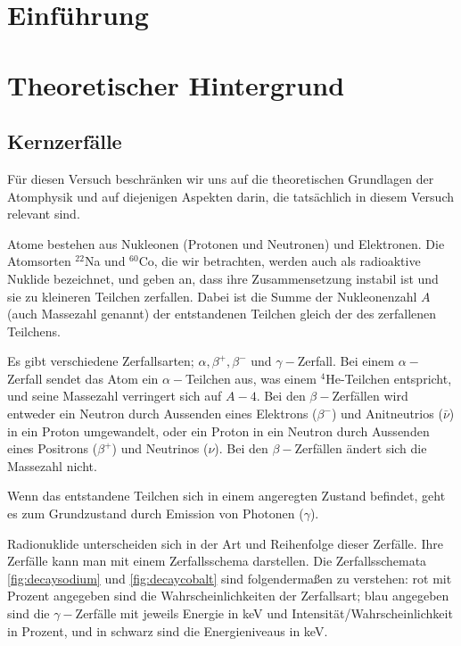 \documentclass[%
aps,
onecolumn,
11pt,
tightenlines,
nofootinbib,
superscriptaddress,
floatfix,
prd,
]{revtex4-2}
\begin{document}

\section{Einführung}
\label{sec:Einführung}






\section{Theoretischer Hintergrund}
\label{sec:Theorie}

\subsection{Kernzerfälle}
\label{sec:Kernzerfälle}
Für diesen Versuch beschränken wir uns auf die theoretischen Grundlagen der Atomphysik und auf diejenigen Aspekten darin, die tatsächlich in diesem Versuch relevant sind. \par
Atome bestehen aus Nukleonen (Protonen und Neutronen) und Elektronen. Die Atomsorten $^{22}$Na und $^{60}$Co, die wir betrachten, werden auch als radioaktive Nuklide bezeichnet, und geben an, dass ihre Zusammensetzung instabil ist und sie zu kleineren Teilchen zerfallen. Dabei ist die Summe der Nukleonenzahl $A$ (auch Massezahl genannt) der entstandenen Teilchen gleich der des zerfallenen Teilchens. \par
Es gibt verschiedene Zerfallsarten; $\alpha, \beta^+, \beta^-$ und $\gamma-$Zerfall. Bei einem $\alpha-$Zerfall sendet das Atom ein $\alpha-$Teilchen aus, was einem $^4$He-Teilchen entspricht, und seine Massezahl verringert sich auf $A - 4$. Bei den $\beta-$Zerfällen wird entweder ein Neutron durch Aussenden eines Elektrons ($\beta^-$) und Anitneutrios ($\bar \nu$) in ein Proton umgewandelt, oder ein Proton in ein Neutron durch Aussenden eines Positrons ($\beta^+$) und Neutrinos ($\nu$). Bei den $\beta-$Zerfällen ändert sich die Massezahl nicht. \par
Wenn das entstandene Teilchen sich in einem angeregten Zustand befindet, geht es zum Grundzustand durch Emission von Photonen ($\gamma$). \par
Radionuklide unterscheiden sich in der Art und Reihenfolge dieser Zerfälle. Ihre Zerfälle kann man mit einem Zerfallsschema darstellen. Die Zerfallsschemata \ref{fig:decaysodium} und \ref{fig:decaycobalt} sind folgendermaßen zu verstehen: rot mit Prozent angegeben sind die Wahrscheinlichkeiten der Zerfallsart; blau angegeben sind die $\gamma-$Zerfälle mit jeweils Energie in keV und Intensität/Wahrscheinlichkeit in Prozent, und in schwarz sind die Energieniveaus in keV. \vspace{15pt}\par
\end{document}
